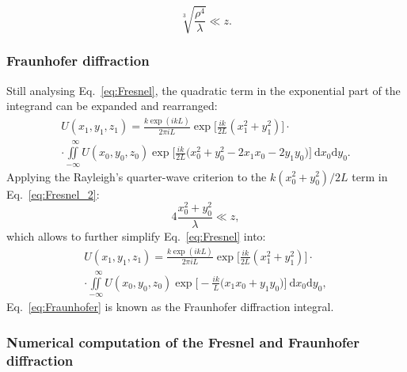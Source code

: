 \begin{refsection}
\begin{equation}\label{eq:accuracy_Fresnel}
    \sqrt[3]{\frac{\rho^4}{\lambda}}\ll z.
\end{equation}

\subsubsection*{Fraunhofer diffraction}

Still analysing Eq.~\ref{eq:Fresnel}, the quadratic term in the exponential part of the integrand can be expanded and rearranged: 
\begin{multline}\label{eq:Fresnel_2}
    U(x_1,y_1,z_1)=\frac{k\exp{(ikL)}}{2\pi i L}\exp{\Bigg[ \frac{ik}{2L}(x_1^2+y_1^2)\Bigg]}\cdot\\
    \cdot\iint\limits_{-\infty}^{\hspace{8pt}\infty}{U(x_0,y_0,z_0)\exp{\Bigg[\frac{ik}{2L}\big(x_0^2+y_0^2-2x_1x_0-2y_1y_0)\Bigg]}~\mathrm{d}x_0\mathrm{d}y_0}.
\end{multline}
Applying the Rayleigh's quarter-wave criterion to the $k(x_0^2+y_0^2)/2L$ term in Eq.~\ref{eq:Fresnel_2}:
\begin{equation}\label{eq:accuracy_Fraunhofer}
    4\frac{x_0^2 +y_0^2}{\lambda}\ll z,
\end{equation}
which allows to further simplify Eq.~\ref{eq:Fresnel} into:
\begin{multline}\label{eq:Fraunhofer}
    U(x_1,y_1,z_1)=\frac{k\exp{(ikL)}}{2\pi i L}\exp{\Bigg[ \frac{ik}{2L}(x_1^2+y_1^2)\Bigg]}\cdot\\
    \cdot\iint\limits_{-\infty}^{\hspace{8pt}\infty}{U(x_0,y_0,z_0)\exp{\Bigg[-\frac{ik}{L}\big(x_1x_0+y_1y_0)\Bigg]}~\mathrm{d}x_0\mathrm{d}y_0},
\end{multline}
Eq.~\ref{eq:Fraunhofer} is known as the Fraunhofer diffraction integral.

\subsubsection*{Numerical computation of the Fresnel and Fraunhofer diffraction}


\end{refsection}
